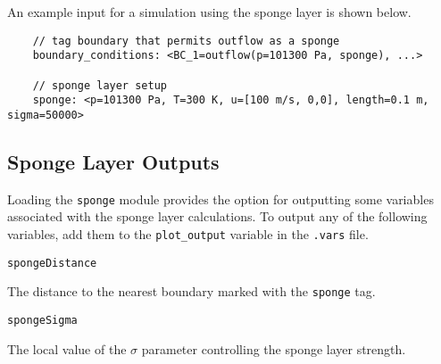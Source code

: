 \documentclass{article}
\begin{document}
An example input for a simulation using the sponge layer is shown below.

\begin{verbatim}
	// tag boundary that permits outflow as a sponge
	boundary_conditions: <BC_1=outflow(p=101300 Pa, sponge), ...>
	      
	// sponge layer setup
	sponge: <p=101300 Pa, T=300 K, u=[100 m/s, 0,0], length=0.1 m, sigma=50000>
\end{verbatim}


\subsection{Sponge Layer Outputs}

Loading the {\tt sponge} module provides the option for outputting some variables associated with the sponge layer calculations. To output any of the following variables, add them to the \verb!plot_output! variable in the {\tt .vars} file.

  \begin{list}{}{}
  	
  	
  	\item {\tt spongeDistance}
  	
  	The distance to the nearest boundary marked with the {\tt sponge} tag.
  	
  	\item {\tt spongeSigma}
  	
  	The local value of the {\tt $\sigma$} parameter controlling the sponge layer strength.
  	
  \end{list}


\clearpage





\end{document}
